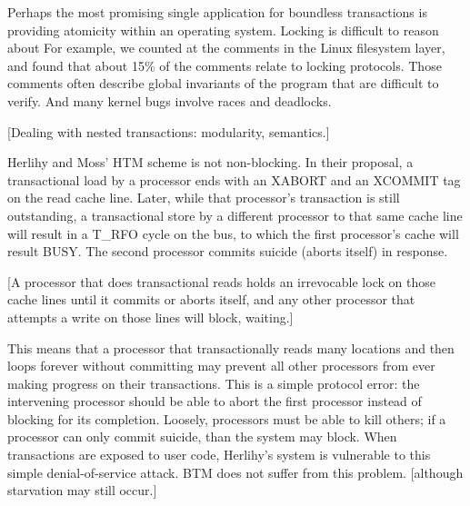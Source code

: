 \documentclass{csa-sig-alternate}
\newcommand{\var}[1]{\ensuremath{\text{\it #1}}}
\begin{document}
{%





Perhaps the most promising single application for boundless
transactions is providing atomicity within an operating system.
Locking is difficult to reason about For example, we counted at the
comments in the Linux filesystem layer, and found that about 15\% of
the comments relate to locking protocols.  Those comments often
describe global invariants of the program that are difficult to
verify.  And many kernel bugs involve races and deadlocks.

[Dealing with nested transactions: modularity, semantics.]



  Herlihy
and Moss' HTM scheme is not non-blocking.  In their proposal, a
transactional load by a processor ends with an XABORT and an XCOMMIT
tag on the read cache line.  Later, while that processor's transaction
is still outstanding, a transactional store by a different processor
to that same cache line will result in a T\_RFO cycle on the bus, to
which the first processor's cache will result BUSY.  The second
processor commits suicide (aborts itself) in response.

[A processor that does transactional reads holds an irrevocable lock
on those cache lines until it commits or aborts itself, and any
other processor that attempts a write on those lines will block,
waiting.]

This means that a processor that transactionally reads many locations
and then loops forever without committing may prevent all other
processors from ever making progress on their transactions.  This is a
simple protocol error: the intervening processor should be able to
abort the first processor instead of blocking for its completion.
Loosely, processors must be able to kill others; if a processor can
only commit suicide, than the system may block.  When transactions are
exposed to user code, Herlihy's system is vulnerable to this simple
denial-of-service attack.  BTM does not suffer from this
problem. [although starvation may still occur.]

}%
\end{document}
